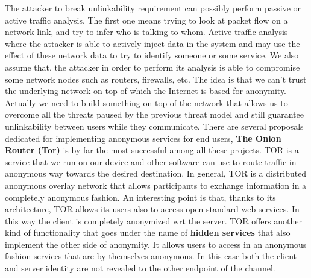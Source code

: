 The attacker to break unlinkability requirement can possibly perform passive or active traffic analysis. The first one means trying to look at packet flow on a network link, and try to infer who is talking to whom. Active traffic analysis where the attacker is able to actively inject data in the system and may use the effect of these network data to try to identify someone or some service. We also assume that, the attacker in order to perform its analysis is able to compromise some network nodes such as routers, firewalls, etc. The idea is that we can't trust the underlying network on top of which the Internet is based for anonymity. Actually we need to build something on top of the network that allows us to overcome all the threats paused by the previous threat model and still guarantee unlinkability between users while they communicate. There are several proposals dedicated for implementing anonymous services for end users, \textbf{The Onion Router (Tor)} is by far the most successful among all these projects. TOR is a service that we run on our device and other software can use to route traffic in anonymous way towards the desired destination. In general, TOR is a distributed anonymous overlay network that allows participants to exchange information in a completely anonymous fashion. An interesting point is that, thanks to its architecture, TOR allows its users also to access open standard web services. In this way the client is completely anonymized wrt the server. TOR offers another kind of functionality that goes under the name of \textbf{hidden services} that also implement the other side of anonymity. It allows users to access in an anonymous fashion services that are by themselves anonymous. In this case both the client and server identity are not revealed to the other endpoint of the channel.
